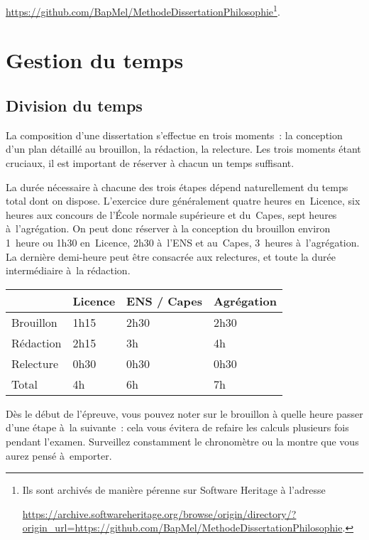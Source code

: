 \documentclass[a4paper,12pt]{report}
\begin{document}
\noindent
\url{https://github.com/BapMel/MethodeDissertationPhilosophie}\footnote{Ils sont archivés de manière pérenne sur Software Heritage à
l'adresse

\noindent
\url{https://archive.softwareheritage.org/browse/origin/directory/?origin\_url=https://github.com/BapMel/MethodeDissertationPhilosophie}.}.


\setcounter{tocdepth}{3}
\tableofcontents

\part{Gestion du temps}
\label{sec:org379ccd2}
\label{orga01d9f0}

\chapter{Division du temps}
\label{sec:orgeef1619}

La composition d'une dissertation s'effectue en trois moments : la
conception d'un plan détaillé au brouillon, la rédaction, la relecture.
Les trois moments étant cruciaux, il est important de réserver à chacun
un temps suffisant.

La durée nécessaire à chacune des trois étapes dépend naturellement du
temps total dont on dispose. L'exercice dure généralement quatre heures
en Licence, six heures aux concours de l'École normale supérieure et
du Capes, sept heures à l'agrégation. On peut donc réserver à la
conception du brouillon environ 1 heure ou 1h30 en Licence, 2h30 à l'ENS
et au Capes, 3 heures à l'agrégation. La dernière demi-heure peut être
consacrée aux relectures, et toute la durée intermédiaire à la
rédaction.

\begin{center}
\begin{tabular}{|l|l|l|l|}
\hline
 & Licence & ENS / Capes & Agrégation\\[0pt]
\hline
\hline
Brouillon & 1h15 & 2h30 & 2h30\\[0pt]
Rédaction & 2h15 & 3h & 4h\\[0pt]
Relecture & 0h30 & 0h30 & 0h30\\[0pt]
\hline
\hline
Total & 4h & 6h & 7h\\[0pt]
\hline
\end{tabular}
\end{center}

Dès le début de l'épreuve, vous pouvez noter sur le brouillon à quelle
heure passer d'une étape à la suivante : cela vous évitera de refaire
les calculs plusieurs fois pendant l'examen. Surveillez constamment le
chronomètre ou la montre que vous aurez pensé à emporter.
\end{document}
